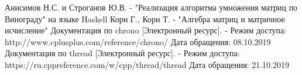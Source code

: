 \newpage
{}

\begin{thebibliography}{}
     Анисимов Н.С. и Строганов Ю.В. - "Реализация алгоритма умножения матриц по Винограду"
на языке Haskell
     Корн Г., Корн Т. - "Алгебра матриц и матричное исчисление"
     Документация по chrono [Электронный ресурс]. -
    Режим доступа: http://www.cplusplus.com/reference/chrono/
    Дата обращения: 08.10.2019
     Документация по thread [Электронный ресурс]. -
    Режим доступа: https://ru.cppreference.com/w/cpp/thread/thread
    Дата обращения: 21.10.2019
\end{thebibliography}
